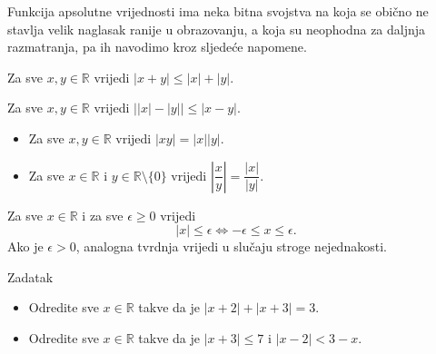 Funkcija apsolutne vrijednosti ima neka bitna svojstva na koja se obično ne stavlja velik naglasak ranije u obrazovanju, a koja su neophodna za daljnja razmatranja, pa ih navodimo kroz sljedeće napomene.
\begin{remark}
\label{triangleineq}
Za sve $x, y\in \mathbb{R}$ vrijedi $\lvert x+y\rvert\leq \lvert x\rvert + \lvert y\rvert$.
\end{remark}
\begin{remark}
\label{invtriangleineq}
Za sve $x, y\in \mathbb{R}$ vrijedi $\lvert\lvert x\rvert-\lvert y\rvert\rvert\leq \lvert x-y\rvert$.
\end{remark}
\begin{remark} \textbf{}
\begin{itemize}
\item[a)] Za sve $x, y\in \mathbb{R}$ vrijedi $\lvert xy\rvert=\lvert x\rvert\lvert y\rvert$. 
\item[b)] Za sve $x\in \mathbb{R}$ i $y\in \mathbb{R}\setminus\{0\}$ vrijedi $\left\lvert \dfrac{x}{y}\right\rvert=\dfrac{\lvert x\rvert}{\lvert y\rvert}$.
\end{itemize}
\end{remark}
\begin{remark}
\label{absolutevaluelemma}
Za sve $x\in \mathbb{R}$ i za sve $\epsilon\geq 0$ vrijedi
$$\lvert x\rvert\leq \epsilon\Leftrightarrow -\epsilon\leq x\leq \epsilon.$$
Ako je $\epsilon>0$, analogna tvrdnja vrijedi u slučaju stroge nejednakosti.
\end{remark}
\begin{exercise}{Zadatak} \textbf{}
\begin{itemize}
\item[a)] Odredite sve $x\in \mathbb{R}$ takve da je $\left\lvert x+2\right\rvert+\left\lvert x+3\right\rvert=3$.
\item[b)] Odredite sve $x\in \mathbb{R}$ takve da je $\lvert x+3\rvert\leq 7$ i $\lvert x-2\rvert< 3-x$.
\end{itemize}
\end{exercise}

